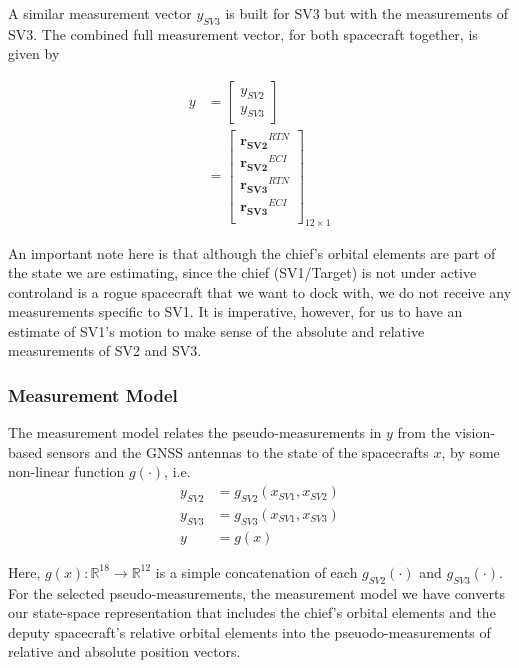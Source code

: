 A similar measurement vector $y_{SV3}$ is built for SV3 but with the measurements of SV3. The combined full measurement vector, for both spacecraft together, is given by

\begin{align}
    y &= \begin{bmatrix}
        y_{SV2} \\
        y_{SV3}
    \end{bmatrix} \\
    &= \begin{bmatrix}
        \boldsymbol{r_{SV2}}^{RTN}\\
        \boldsymbol{r_{SV2}}^{ECI} \\
        \boldsymbol{r_{SV3}}^{RTN} \\
        \boldsymbol{r_{SV3}}^{ECI} \\
    \end{bmatrix}_{12\times 1}
\end{align}

An important note here is that although the chief's orbital elements are part of the state we are estimating, since the chief (SV1/Target) is not under active controland is a rogue spacecraft that we want to dock with, we do not receive any measurements specific to SV1. It is imperative, however, for us to have an estimate of SV1's motion to make sense of the absolute and relative measurements of SV2 and SV3.

\subsubsection{Measurement Model}
The measurement model relates the pseudo-measurements in $y$ from the vision-based sensors and the GNSS antennas to the state of the spacecrafts $x$, by some non-linear function $g(\cdot)$, i.e.
\begin{align}
    y_{SV2} &= g_{SV2}(x_{SV1}, x_{SV2}) \\
    y_{SV3} &= g_{SV3}(x_{SV1}, x_{SV3}) \\
    y &= g(x)
\end{align}

Here, $g(x):\mathbb{R}^{18} \rightarrow \mathbb{R}^{12}$ is a simple concatenation of each $g_{SV2}(\cdot)$ and $g_{SV3}(\cdot)$. For the selected pseudo-measurements, the measurement model we have converts our state-space representation that includes the chief's orbital elements and the deputy spacecraft's relative orbital elements into the pseuodo-measurements of relative and absolute position vectors.

